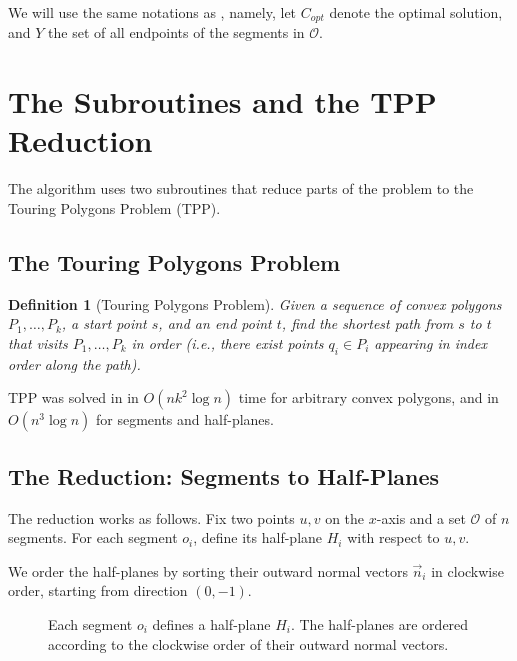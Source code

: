 \documentclass{article}
\newtheorem{definition}{Definition}
\begin{document}
We will use the same notations as \cite{Antoniadis_deBerg_Kisfaludi-Bak_Skarlatos_2025}, namely, let $C_{opt}$ denote the optimal solution, and $Y$ the set of all endpoints 
of the segments in $\mathcal{O}$. 


\section{The Subroutines and the TPP Reduction}

The algorithm uses two subroutines that reduce parts of the problem to the
Touring Polygons Problem (TPP).

\subsection{The Touring Polygons Problem}

\begin{definition}[Touring Polygons Problem]
Given a sequence of convex polygons $P_1, \ldots, P_k$, a start point $s$, and
an end point $t$, find the shortest path from $s$ to $t$ that visits $P_1, \ldots,
P_k$ in order (i.e., there exist points $q_i \in P_i$ appearing in index order
along the path).
\end{definition}

TPP was solved in \cite{10.1145/780542.780612} in $O(nk^2 \log n)$ time for
arbitrary convex polygons, and in $O(n^3 \log n)$ for segments and half-planes.

\subsection{The Reduction: Segments to Half-Planes}

The reduction works as follows. Fix two points $u, v$ on the $x$-axis and a set
$\mathcal{O}$ of $n$ segments. For each segment $o_i$, define its half-plane $H_i$
with respect to $u, v$.

We order the half-planes by sorting their outward normal vectors $\vec{n}_i$ in
clockwise order, starting from direction $(0, -1)$.
\begin{figure}[ht] 
    \centering 
    \caption{ Each segment $o_i$ defines a half-plane $H_i$. The half-planes are ordered according to the clockwise order of their outward normal vectors. } 
    \label{fig:halfplane-ordering} 
\end{figure}
\end{document}
